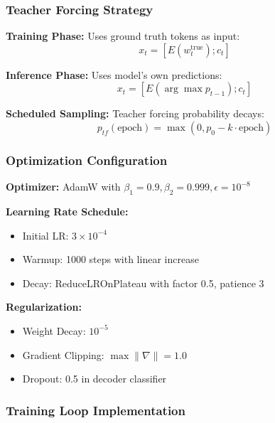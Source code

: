 \documentclass[conference]{IEEEtran}
\begin{document}
\subsubsection{Teacher Forcing Strategy}
\label{sec:q1_teacher_forcing}

\textbf{Training Phase:} Uses ground truth tokens as input:
\begin{equation}
x_t = [E(w_t^{\text{true}}); c_t]
\end{equation}

\textbf{Inference Phase:} Uses model's own predictions:
\begin{equation}
x_t = [E(\arg\max p_{t-1}); c_t]
\end{equation}

\textbf{Scheduled Sampling:} Teacher forcing probability decays:
\begin{equation}
p_{tf}(\text{epoch}) = \max(0, p_0 - k \cdot \text{epoch})
\end{equation}

\subsubsection{Optimization Configuration}
\label{sec:q1_optimization}

\textbf{Optimizer:} AdamW with $\beta_1 = 0.9, \beta_2 = 0.999, \epsilon = 10^{-8}$

\textbf{Learning Rate Schedule:}
\begin{itemize}
  \item Initial LR: $3 \times 10^{-4}$
  \item Warmup: 1000 steps with linear increase
  \item Decay: ReduceLROnPlateau with factor 0.5, patience 3
\end{itemize}

\textbf{Regularization:}
\begin{itemize}
  \item Weight Decay: $10^{-5}$
  \item Gradient Clipping: $\max\|\nabla\| = 1.0$
  \item Dropout: 0.5 in decoder classifier
\end{itemize}

\subsubsection{Training Loop Implementation}
\label{sec:q1_training_loop}
\end{document}
